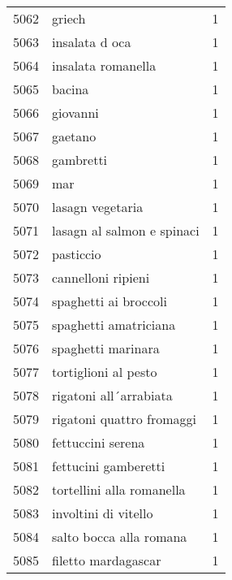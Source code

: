 \begin{tabular}{llr}
5062 &                                             griech &      1 \\
5063 &                                     insalata d oca &      1 \\
5064 &                                 insalata romanella &      1 \\
5065 &                                             bacina &      1 \\
5066 &                                           giovanni &      1 \\
5067 &                                            gaetano &      1 \\
5068 &                                          gambretti &      1 \\
5069 &                                                mar &      1 \\
5070 &                                   lasagn vegetaria &      1 \\
5071 &                         lasagn al salmon e spinaci &      1 \\
5072 &                                          pasticcio &      1 \\
5073 &                                 cannelloni ripieni &      1 \\
5074 &                              spaghetti ai broccoli &      1 \\
5075 &                              spaghetti amatriciana &      1 \\
5076 &                                 spaghetti marinara &      1 \\
5077 &                               tortiglioni al pesto &      1 \\
5078 &                             rigatoni all´arrabiata &      1 \\
5079 &                          rigatoni quattro fromaggi &      1 \\
5080 &                                  fettuccini serena &      1 \\
5081 &                               fettucini gamberetti &      1 \\
5082 &                          tortellini alla romanella &      1 \\
5083 &                               involtini di vitello &      1 \\
5084 &                            salto bocca alla romana &      1 \\
5085 &                                filetto mardagascar &      1 \\

\end{tabular}
